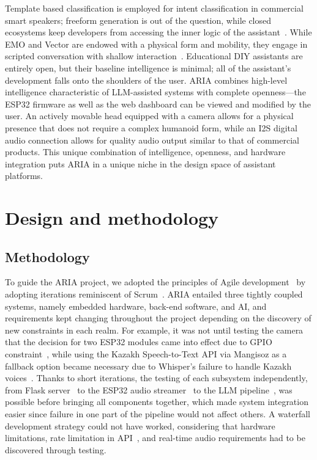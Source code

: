 \noindent %
Template based classification is employed for intent classification in commercial smart speakers; freeform generation is out of the question, while closed ecosystems keep developers from accessing the inner logic of the assistant~\cite{hoy2018alexa, purington2017alexa}. While EMO and Vector are endowed with a physical form and mobility, they engage in scripted conversation with shallow interaction~\cite{designingrobots2018}. Educational DIY assistants are entirely open, but their baseline intelligence is minimal; all of the assistant's development falls onto the shoulders of the user. ARIA combines high-level intelligence characteristic of LLM-assisted systems with complete openness—the ESP32 firmware as well as the web dashboard can be viewed and modified by the user. An actively movable head equipped with a camera allows for a physical presence that does not require a complex humanoid form, while an I2S digital audio connection allows for quality audio output similar to that of commercial products. This unique combination of intelligence, openness, and hardware integration puts ARIA in a unique niche in the design space of assistant platforms.





\chapter{Design and methodology}

\section{Methodology}

To guide the ARIA project, we adopted the principles of Agile development~\cite{agile-manifesto} by adopting iterations reminiscent of Scrum~\cite{scrum-guide}. ARIA entailed three tightly coupled systems, namely embedded hardware, back-end software, and AI, and requirements kept changing throughout the project depending on the discovery of new constraints in each realm. For example, it was not until testing the camera that the decision for two ESP32 modules came into effect due to GPIO constraint~\cite{esp-idf}, while using the Kazakh Speech-to-Text API via Mangisoz as a fallback option became necessary due to Whisper's failure to handle Kazakh voices~\cite{whisper, faster-whisper}. Thanks to short iterations, the testing of each subsystem independently, from Flask server~\cite{flask} to the ESP32 audio streamer~\cite{esp-idf} to the LLM pipeline~\cite{gemini-api}, was possible before bringing all components together, which made system integration easier since failure in one part of the pipeline would not affect others. A waterfall development strategy could not have worked, considering that hardware limitations, rate limitation in API~\cite{flask-limiter}, and real-time audio requirements had to be discovered through testing.


